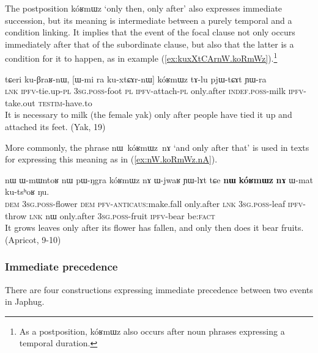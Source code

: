 \documentclass[oldfontcommands,oneside,a4paper,11pt]{article}
\newcommand{\ipa}[1]{{\phon \mbox{#1}}} %
\newcommand{\refb}[1]{(\ref{#1})}
\begin{document}
The postposition \ipa{kóʁmɯz} `only then, only after' also expresses immediate succession, but its meaning is intermediate between a purely temporal and a condition linking. It implies that the event of the focal clause not only occurs immediately after that of the subordinate clause, but also that the latter is a condition for it to happen, as  in example \refb{ex:kuxXtCArnW.koRmWz}.\footnote{As a postposition, \ipa{kóʁmɯz} also occurs after noun phrases expressing a temporal duration.}


\begin{exe}
\ex \label{ex:kuxXtCArnW.koRmWz}
\gll
\ipa{tɕeri}  	\ipa{ku-βraʁ-nɯ,}  	[\ipa{ɯ-mi}  	\ipa{ra}  	\ipa{ku-xtɕɤr-nɯ}]  	\ipa{kóʁmɯz}  	\ipa{tɤ-lu}  	\ipa{pjɯ-tɕɤt}  	\ipa{ɲɯ-ra}  \\
\textsc{lnk} \textsc{ipfv}-tie.up-\textsc{pl} \textsc{3sg.poss}-foot \textsc{pl} \textsc{ipfv}-attach-\textsc{pl} only.after \textsc{indef.poss}-milk \textsc{ipfv}-take.out  \textsc{testim}-have.to \\
\glt It is necessary to milk (the female yak) only after people have tied it up and attached its feet. (Yak, 19)
\end{exe}

More commonly, the phrase \ipa{nɯ kóʁmɯz nɤ} `and only after that' is used in texts for expressing this meaning as in \refb{ex:nW.koRmWz.nA}.
\begin{exe}
\ex \label{ex:nW.koRmWz.nA}
\gll
\ipa{nɯ}  	\ipa{ɯ-mɯntoʁ}  	\ipa{nɯ}  	\ipa{pɯ-ŋgra}  	\ipa{kóʁmɯz}  	\ipa{nɤ}  	\ipa{ɯ-jwaʁ}  	\ipa{ɲɯ-lɤt}  	\ipa{tɕe}  	\ipa{\textbf{nɯ}}  	\ipa{\textbf{kóʁmɯz}}  	\ipa{\textbf{nɤ}}  	\ipa{ɯ-mat}  	\ipa{ku-tsʰoʁ}  	\ipa{ŋu.}  	\\
\textsc{dem} \textsc{3sg.poss}-flower \textsc{dem} \textsc{pfv}-\textsc{anticaus}:make.fall only.after \textsc{lnk} \textsc{3sg.poss}-leaf \textsc{ipfv}-throw \textsc{lnk}  	\ipa{nɯ} only.after \textsc{3sg.poss}-fruit \textsc{ipfv}-bear be:\textsc{fact} \\
\glt It grows leaves only after its flower has fallen, and only then does it bear fruits. (Apricot, 9-10)
\end{exe}


\subsubsection{Immediate precedence}
There are four constructions expressing immediate precedence between two events in Japhug. 
\end{document}
